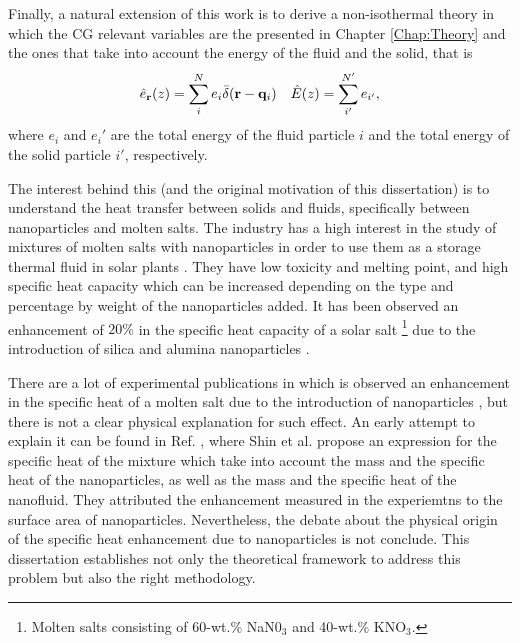 \documentclass[b5paper,openright,10pt]{book}
\begin{document}

Finally, a natural extension of this work is to derive a non-isothermal theory in which the CG relevant variables are the presented in Chapter \ref{Chap:Theory} and the ones that take into account the energy of the fluid and the solid, that is
\begin{align}
  \hat{e}_{\bf r}(z) = \sum_i^N e_i\bar{\delta}({\bf r}-{\bf q}_i) &&  \hat{E}(z)=\sum_{i'}^{N'}e_{i'},
\end{align}
where $e_i$ and $e_i'$ are the total energy of the fluid particle $i$ and the total energy of the solid particle $i'$, respectively. 

The interest behind this (and the original motivation of this dissertation) is to understand the heat transfer between solids and fluids, specifically between nanoparticles and molten salts. 
The industry has a high interest in the study of mixtures of molten salts with nanoparticles in order to use them as a storage thermal fluid in solar plants \cite{Mahian2013,Schuller2015b, Shahrul2014a,Goharshadi2013a,Serrano-Lopez2013}. 
They have low toxicity and melting point, and high specific heat capacity which can be increased depending on the type and percentage by weight of the nanoparticles added. 
It has been observed an enhancement of $20\%$  in the specific heat capacity of a solar
salt \footnote{Molten salts consisting of 60-wt.$\%$ NaN0$_3$ and 40-wt.\% KNO$_3$. } due to the introduction of silica and alumina nanoparticles \cite{Chieruzzi2013a}.
  
There are a lot of experimental publications in which is observed an enhancement in the specific heat of a molten salt due to the introduction of nanoparticles \cite{Schuller2015b, Chieruzzi2013a,Khanafer2015a}, but there is not a clear physical explanation for such effect.
An early attempt to explain it can be found in Ref. \cite{Shin2014}, where Shin et al. propose an expression for the specific heat of the mixture which take into account the mass and the specific heat of the nanoparticles, as well as the mass and the specific heat of the nanofluid. They attributed the enhancement measured in the experiemtns to the surface area of nanoparticles. Nevertheless, the debate about the physical origin of the specific heat enhancement due to nanoparticles is not conclude. This dissertation establishes not only the theoretical framework to address this problem but also the right methodology.
\end{document}
